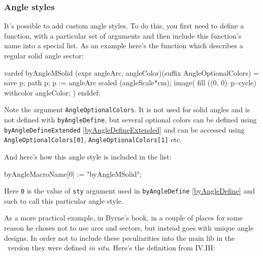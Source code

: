 \documentclass{ltxdoc}
\begin{document}
\subsubsection{Angle styles}\label{AngleStyles}

	It's possible to add custom angle styles. To do this, you first need to define a function, with a particular set of arguments and then include this function's name into a special list. As an example here's the function which describes a regular solid angle sector:
	
\begin{MetaPostCode}
vardef byAngleMSolid (expr angleArc, angleColor)(suffix AngleOptionalColors) =
    save p;
    path p;
    p := angleArc scaled (angleScale*cm);
    image(
        fill ((0, 0)--p--cycle) withcolor angleColor;
    )
enddef;
\end{MetaPostCode}

	Note the argument \texttt{AngleOptionalColors}. It is not used for solid angles and is not defined with \texttt{byAngleDefine}, but several optional colors can be defined using \texttt{byAngleDefineExtended} \ref{byAngleDefineExtended} and can be accessed using \texttt{AngleOptionalColors[0]}, \texttt{AngleOptionalColors[1]} etc.

	And here's how this angle style is included in the list:

\begin{MetaPostCode}
byAngleMacroName[0] := "byAngleMSolid";
\end{MetaPostCode}

	Here \texttt{0} is the value of \texttt{sty} argument used in \texttt{byAngleDefine} \ref{byAngleDefine} and such to call this particular angle style.
	
	As a more practical example, in Byrne's book, in a couple of places for some reason he choses not to use arcs and sectors, but instead goes with unique angle designs. In order not to include these peculiarities into the main lib in the \ConTeXt\ version they were defined \textit{in situ}. Here's the definition from IV.III:

	
\end{document}
